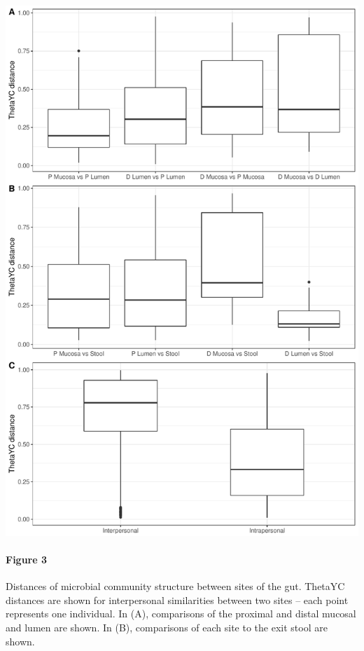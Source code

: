 \documentclass[11pt,]{article}
\let\oldparagraph\paragraph
\renewcommand{\paragraph}[1]{\oldparagraph{#1}\mbox{}}
\begin{document}
\includegraphics{../submission/figure_3.pdf}

\paragraph{Figure 3}\label{figure-3}

Distances of microbial community structure between sites of the gut.
ThetaYC distances are shown for interpersonal similarities between two
sites -- each point represents one individual. In (A), comparisons of
the proximal and distal mucosal and lumen are shown. In (B), comparisons
of each site to the exit stool are shown.

\newpage
\end{document}
